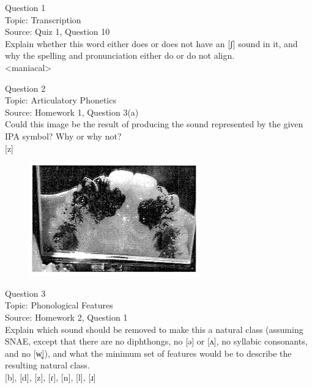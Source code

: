 \documentclass[12pt]{article}
\begin{document}
{\large Question 1}\\

Topic: Transcription\\
Source: Quiz 1, Question 10\\

Explain whether this word either does or does not have an [ʃ] sound in it, and why the spelling and pronunciation either do or do not align.\\

<maniacal>


\newpage

{\large Question 2}\\

Topic: Articulatory Phonetics\\
Source: Homework 1, Question 3(a)\\

Could this image be the result of producing the sound represented by the given IPA symbol? Why or why not?\\

{[z]}

\begin{figure}[H]
\includegraphics{../images/staticpalatography_fricative.png}
\end{figure}

\newpage

{\large Question 3}\\

Topic: Phonological Features\\
Source: Homework 2, Question 1\\

Explain which sound should be removed to make this a natural class (assuming SNAE, except that there are no diphthongs, no [ə] or [ʌ], no syllabic consonants, and no [w̥]), and what the minimum set of features would be to describe the resulting natural class.\\

{[b]}, {[d]}, {[z]}, {[ɾ]}, {[n]}, {[l]}, {[ɹ]}
\end{document}
